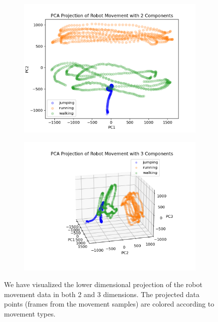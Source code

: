 \documentclass[11pt]{amsart}
\begin{document}
\begin{figure}[h]
    \centering
    \begin{subfigure}{0.4\textwidth}
        \centering
        \includegraphics[width=\textwidth]{../visualizations/pca_2_components_plot.png}
        \label{fig:image1}
    \end{subfigure}
    \begin{subfigure}{0.49\textwidth}
        \centering
        \includegraphics[width=\textwidth]{../visualizations/pca_3_components_plot.png}
        \label{fig:image2}
    \end{subfigure}
    \caption{We have visualized the lower dimensional projection of the robot movement data in both 2 and 3 dimensions.
    The projected data points (frames from the movement samples) are colored according to movement types.}
    \label{fig:f1}
\end{figure}
\end{document}
